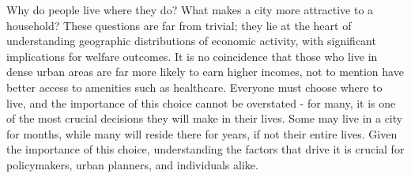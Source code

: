 \documentclass[10pt]{article}
\begin{document}




Why do people live where they do? What makes a city more attractive to a household? These questions are far from trivial; they lie at the heart of understanding geographic distributions of economic activity, with significant implications for welfare outcomes. It is no coincidence that those who live in dense urban areas are far more likely to earn higher incomes, not to mention have better access to amenities such as healthcare. Everyone must choose where to live, and the importance of this choice cannot be overstated - for many, it is one of the most crucial decisions they will make in their lives. Some may live in a city for months, while many will reside there for years, if not their entire lives. Given the importance of this choice, understanding the factors that drive it is crucial for policymakers, urban planners, and individuals alike.
\end{document}
